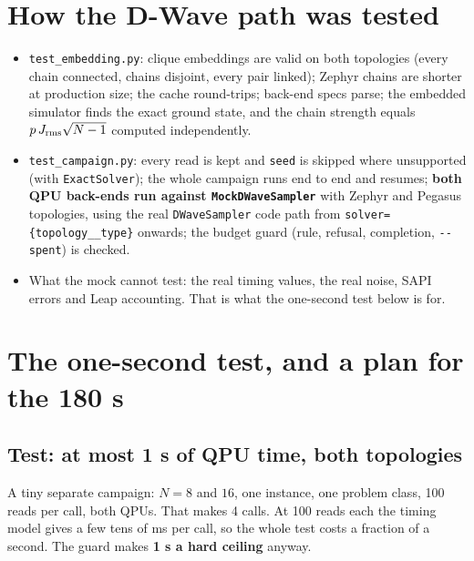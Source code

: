 \documentclass[11pt,a4paper]{article}
\newcommand{\code}[1]{\nolinkurl{#1}}
\begin{document}
\section{How the D-Wave path was tested}
\begin{itemize}
\item \code{test_embedding.py}: clique embeddings are valid on both topologies (every chain connected, chains disjoint, every pair linked); Zephyr chains are shorter at production size; the cache round-trips; back-end specs parse; the embedded simulator finds the exact ground state, and the chain strength equals $p\,J_{\rm rms}\sqrt{N-1}$ computed independently.
\item \code{test_campaign.py}: every read is kept and \code{seed} is skipped where unsupported (with \code{ExactSolver}); the whole campaign runs end to end and resumes; \textbf{both QPU back-ends run against \code{MockDWaveSampler}} with Zephyr and Pegasus topologies, using the real \code{DWaveSampler} code path from \code{solver={topology__type}} onwards; the budget guard (rule, refusal, completion, \code{--spent}) is checked.
\item What the mock cannot test: the real timing values, the real noise, SAPI errors and Leap accounting. That is what the one-second test below is for.
\end{itemize}

\section{The one-second test, and a plan for the 180 s}\label{sec:plan}
\subsection{Test: at most 1 s of QPU time, both topologies}
A tiny separate campaign: $N=8$ and $16$, one instance, one problem class, 100 reads per call, both QPUs.
That makes 4 calls. At 100 reads each the timing model gives a few tens of ms per call, so the whole test costs a
fraction of a second. The guard makes \textbf{1 s a hard ceiling} anyway.
\end{document}
